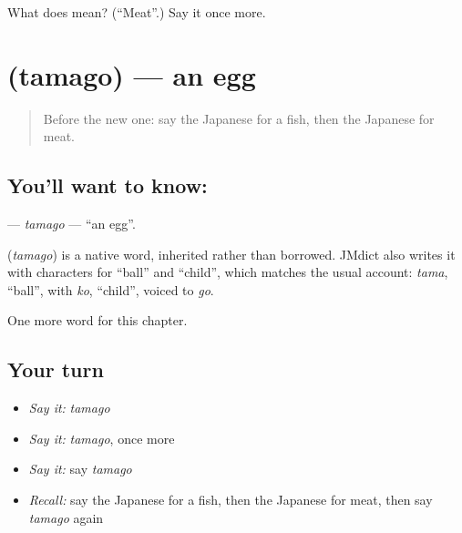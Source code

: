 \begin{tcolorbox}[breakable,colback=teal!4,colframe=teal!35!black,title={Before you move on}]
What does  mean? (\textquotedblleft{}Meat\textquotedblright{}.) Say it once more.
\end{tcolorbox}
\section[\texorpdfstring{\ja{たまご} (tamago)}{たまご (tamago)}]{ (tamago) — an egg}

\label{lesson:JA-C32-tamago}



\begin{quote}
Before the new one: say the Japanese for a fish, then the Japanese for meat.
\end{quote}

\subsection*{You'll want to know: }
\textbf{} — \emph{tamago} — \textquotedblleft{}an egg\textquotedblright{}.

\begin{cousinweb}
\textbf{} (\emph{tamago}) is a native word, inherited rather than borrowed. JMdict also writes it with characters for \textquotedblleft{}ball\textquotedblright{} and \textquotedblleft{}child\textquotedblright{}, which matches the usual account: \emph{tama}, \textquotedblleft{}ball\textquotedblright{}, with \emph{ko}, \textquotedblleft{}child\textquotedblright{}, voiced to \emph{go}.
\end{cousinweb}

\begin{grammarlens}[title={What you've built}]
One more word for this chapter.
\end{grammarlens}

\subsection*{Your turn}
\begin{itemize}
\raggedright
  \item \emph{Say it:} \emph{tamago}
  \item \emph{Say it:} \emph{tamago}, once more
  \item \emph{Say it:} say \emph{tamago}
  \item \emph{Recall:} say the Japanese for a fish, then the Japanese for meat, then say \emph{tamago} again
\end{itemize}

